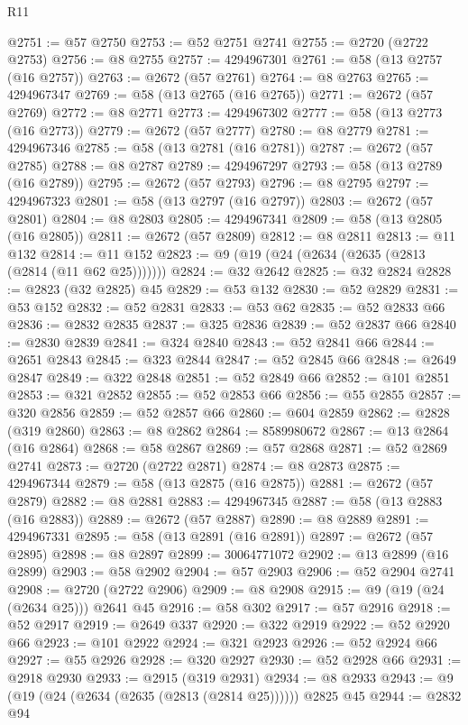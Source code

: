 \begin{lexlean}{R11}
\begin{coremodule}
@2751 := @57 @2750
@2753 := @52 @2751 @2741
@2755 := @2720 (@2722 @2753)
@2756 := @8 @2755
@2757 := 4294967301
@2761 := @58 (@13 @2757 (@16 @2757))
@2763 := @2672 (@57 @2761)
@2764 := @8 @2763
@2765 := 4294967347
@2769 := @58 (@13 @2765 (@16 @2765))
@2771 := @2672 (@57 @2769)
@2772 := @8 @2771
@2773 := 4294967302
@2777 := @58 (@13 @2773 (@16 @2773))
@2779 := @2672 (@57 @2777)
@2780 := @8 @2779
@2781 := 4294967346
@2785 := @58 (@13 @2781 (@16 @2781))
@2787 := @2672 (@57 @2785)
@2788 := @8 @2787
@2789 := 4294967297
@2793 := @58 (@13 @2789 (@16 @2789))
@2795 := @2672 (@57 @2793)
@2796 := @8 @2795
@2797 := 4294967323
@2801 := @58 (@13 @2797 (@16 @2797))
@2803 := @2672 (@57 @2801)
@2804 := @8 @2803
@2805 := 4294967341
@2809 := @58 (@13 @2805 (@16 @2805))
@2811 := @2672 (@57 @2809)
@2812 := @8 @2811
@2813 := @11 @132
@2814 := @11 @152
@2823 := @9 (@19 (@24 (@2634 (@2635 (@2813 (@2814 (@11 @62 @25)))))))
@2824 := @32 @2642
@2825 := @32 @2824
@2828 := @2823 (@32 @2825) @45
@2829 := @53 @132
@2830 := @52 @2829
@2831 := @53 @152
@2832 := @52 @2831
@2833 := @53 @62
@2835 := @52 @2833 @66
@2836 := @2832 @2835
@2837 := @325 @2836
@2839 := @52 @2837 @66
@2840 := @2830 @2839
@2841 := @324 @2840
@2843 := @52 @2841 @66
@2844 := @2651 @2843
@2845 := @323 @2844
@2847 := @52 @2845 @66
@2848 := @2649 @2847
@2849 := @322 @2848
@2851 := @52 @2849 @66
@2852 := @101 @2851
@2853 := @321 @2852
@2855 := @52 @2853 @66
@2856 := @55 @2855
@2857 := @320 @2856
@2859 := @52 @2857 @66
@2860 := @604 @2859
@2862 := @2828 (@319 @2860)
@2863 := @8 @2862
@2864 := 8589980672
@2867 := @13 @2864 (@16 @2864)
@2868 := @58 @2867
@2869 := @57 @2868
@2871 := @52 @2869 @2741
@2873 := @2720 (@2722 @2871)
@2874 := @8 @2873
@2875 := 4294967344
@2879 := @58 (@13 @2875 (@16 @2875))
@2881 := @2672 (@57 @2879)
@2882 := @8 @2881
@2883 := 4294967345
@2887 := @58 (@13 @2883 (@16 @2883))
@2889 := @2672 (@57 @2887)
@2890 := @8 @2889
@2891 := 4294967331
@2895 := @58 (@13 @2891 (@16 @2891))
@2897 := @2672 (@57 @2895)
@2898 := @8 @2897
@2899 := 30064771072
@2902 := @13 @2899 (@16 @2899)
@2903 := @58 @2902
@2904 := @57 @2903
@2906 := @52 @2904 @2741
@2908 := @2720 (@2722 @2906)
@2909 := @8 @2908
@2915 := @9 (@19 (@24 (@2634 @25))) @2641 @45
@2916 := @58 @302
@2917 := @57 @2916
@2918 := @52 @2917
@2919 := @2649 @337
@2920 := @322 @2919
@2922 := @52 @2920 @66
@2923 := @101 @2922
@2924 := @321 @2923
@2926 := @52 @2924 @66
@2927 := @55 @2926
@2928 := @320 @2927
@2930 := @52 @2928 @66
@2931 := @2918 @2930
@2933 := @2915 (@319 @2931)
@2934 := @8 @2933
@2943 := @9 (@19 (@24 (@2634 (@2635 (@2813 (@2814 @25)))))) @2825 @45
@2944 := @2832 @94

\end{coremodule}
\end{lexlean}
